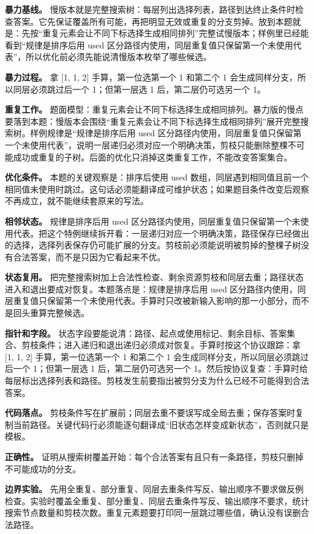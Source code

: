 \textbf{暴力基线。} 慢版本就是完整搜索树：每层列出选择列表，路径到达终止条件时检查答案。它先保证覆盖所有可能，再把明显无效或重复的分支剪掉。放到本题就是：先按“重复元素会让不同下标选择生成相同排列”完整试慢版本；样例里已经能看到“规律是排序后用 used 区分路径内使用，同层重复值只保留第一个未使用代表”，所以优化前必须先能说清慢版本枚举了哪些候选。

\textbf{暴力过程。} 拿 [1, 1, 2] 手算，第一位选第一个 1 和第二个 1 会生成同样分支，所以同层必须跳过后一个 1；但第一层选 1 后，第二层仍可选另一个 1。

\textbf{重复工作。} 题面模型：重复元素会让不同下标选择生成相同排列。暴力版的慢点要落到本题：慢版本会围绕“重复元素会让不同下标选择生成相同排列”展开完整搜索树。样例规律是“规律是排序后用 used 区分路径内使用，同层重复值只保留第一个未使用代表”，说明一层递归必须对应一个明确决策，剪枝只能删除整棵不可能成功或重复的子树。后面的优化只消掉这类重复工作，不能改变答案集合。

\textbf{优化条件。} 本题的关键观察是：排序后使用 used 数组，同层遇到相同值且前一个相同值未使用时跳过。这句话必须能翻译成可维护状态；如果题目条件改变后观察不再成立，就不能继续套原来的写法。

\textbf{相邻状态。} 规律是排序后用 used 区分路径内使用，同层重复值只保留第一个未使用代表。把这个特例继续拆开看：一层递归对应一个明确决策，路径保存已经做出的选择，选择列表保存仍可能扩展的分支。剪枝前必须能说明被剪掉的整棵子树没有合法答案，而不是只因为它看起来不优。

\textbf{状态复用。} 把完整搜索树加上合法性检查、剩余资源剪枝和同层去重；路径状态进入和退出要成对恢复。本题落点是：规律是排序后用 used 区分路径内使用，同层重复值只保留第一个未使用代表。手算时只改被新输入影响的那一小部分，而不是回头重算完整候选。

\textbf{指针和字段。} 状态字段要能说清：路径、起点或使用标记、剩余目标、答案集合、剪枝条件；进入递归和退出递归必须成对恢复。手算时按这个协议跟踪：拿 [1, 1, 2] 手算，第一位选第一个 1 和第二个 1 会生成同样分支，所以同层必须跳过后一个 1；但第一层选 1 后，第二层仍可选另一个 1。然后按协议复查：手算时给每层标出选择列表和路径。剪枝发生前要指出被剪分支为什么已经不可能得到合法答案。

\textbf{代码落点。} 剪枝条件写在扩展前；同层去重不要误写成全局去重；保存答案时复制当前路径。关键代码行必须能逐句翻译成“旧状态怎样变成新状态”，否则就只是模板。

\textbf{正确性。} 证明从搜索树覆盖开始：每个合法答案有且只有一条路径，剪枝只删掉不可能成功的分支。

\textbf{边界实验。} 先用全重复、部分重复、同层去重条件写反、输出顺序不要求做反例检查。实验时覆盖全重复、部分重复、同层去重条件写反、输出顺序不要求，统计搜索节点数量和剪枝次数。重复元素题要打印同一层跳过哪些值，确认没有误删合法路径。

